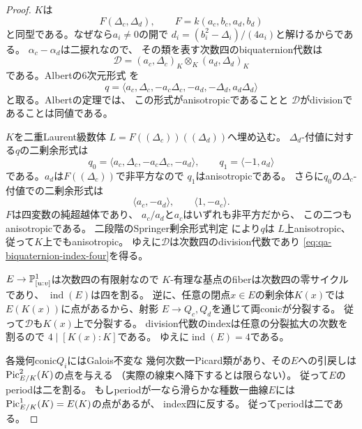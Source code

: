 \begin{proof}
$K$は
\[
 F(\Delta_c,\Delta_d),\qquad
 F=k(a_c,b_c,a_d,b_d)
\]
と同型である。なぜなら$a_i\ne0$の開で
$d_i=(b_i^2-\Delta_i)/(4a_i)$と解けるからである。
$\alpha_c-\alpha_d$は二捩れなので、
その類を表す次数四のbiquaternion代数は
\[
 \mathcal D=(a_c,\Delta_c)_K\otimes_K
             (a_d,\Delta_d)_K
\]
である。Albertの6次元形式
\cite[Theorem~2.3]{LamLeepTignol1993}を
\begin{equation}
 q=\langle a_c,\Delta_c,-a_c\Delta_c,
          -a_d,-\Delta_d,a_d\Delta_d\rangle
 \label{eq:qa-biquaternion-albert-form}
\end{equation}
と取る。Albertの定理では、
この形式がanisotropicであることと
$\mathcal D$がdivisionであることは同値である。

$K$を二重Laurent級数体
$L=F((\Delta_c))((\Delta_d))$へ埋め込む。
$\Delta_d$-付値に対する$q$の二剰余形式は
\[
 q_0=\langle a_c,\Delta_c,-a_c\Delta_c,-a_d\rangle,
 \qquad q_1=\langle-1,a_d\rangle
\]
である。$a_d$は$F((\Delta_c))$で非平方なので
$q_1$はanisotropicである。
さらに$q_0$の$\Delta_c$-付値での二剰余形式は
\[
 \langle a_c,-a_d\rangle,\qquad
 \langle1,-a_c\rangle .
\]
$F$は四変数の純超越体であり、
$a_c/a_d$と$a_c$はいずれも非平方だから、
この二つもanisotropicである。
二段階のSpringer剰余形式判定
\cite[Chapter VI, Proposition~1.9]{LamQuadraticForms2005}により$q$は
$L$上anisotropic、従って$K$上でもanisotropic。
ゆえに$\mathcal D$は次数四のdivision代数であり
\eqref{eq:qa-biquaternion-index-four}を得る。

$E\to\mathbb P^1_{[u:v]}$は次数四の有限射なので
$K$-有理な基点のfiberは次数四の零サイクルであり、
$\operatorname{ind}(E)$は四を割る。
逆に、任意の閉点$x\in E$の剰余体$K(x)$では
$E(K(x))$に点があるから、射影
$E\to Q_c,Q_d$を通じて両conicが分裂する。
従って$\mathcal D$も$K(x)$上で分裂する。
division代数のindexは任意の分裂拡大の次数を割るので
$4\mid[K(x):K]$である。
ゆえに$\operatorname{ind}(E)=4$である。

各幾何conic$Q_i$にはGalois不変な
幾何次数一Picard類があり、その$E$への引戻しは
$\operatorname{Pic}^2_{E/K}(K)$の点を与える
（実際の線束へ降下するとは限らない）。
従って$E$のperiodは二を割る。
もしperiodが一なら滑らかな種数一曲線$E$には
$\operatorname{Pic}^1_{E/K}(K)=E(K)$の点があるが、
index四に反する。
従ってperiodは二である。
\end{proof}


